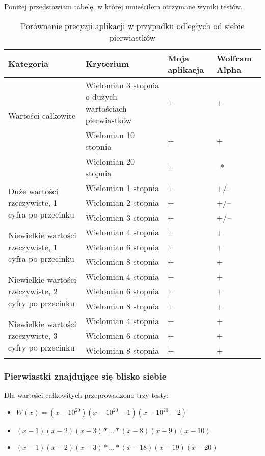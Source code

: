 Poniżej przedstawiam tabelę, w której umieściłem otrzymane wyniki testów.

\begin{table}
	\caption{Porównanie precyzji aplikacji w przypadku odległych od siebie pierwiastków}
	\begin{tabular}{ |p{5cm}|p{5cm}|p{1.5cm}|p{1.5cm}| } 
		\hline
		Kategoria & Kryterium & Moja aplikacja & Wolfram Alpha \\
		\hline
		\multirow{2}{*}{Wartości całkowite}
		& Wielomian 3 stopnia o dużych wartościach pierwiastków & + & + \\
		& Wielomian 10 stopnia & + & + \\
		& Wielomian 20 stopnia & + & --* \\
		\hline
		\multirow{3}{12em}{Duże wartości rzeczywiste, 1 cyfra po przecinku}
		& Wielomian 1 stopnia & + & +/-- \\
		& Wielomian 2 stopnia & + & +/-- \\
		& Wielomian 3 stopnia & + & +/-- \\
		\hline
		\multirow{3}{14em}{Niewielkie wartości rzeczywiste, 1 cyfra po przecinku}
		& Wielomian 4 stopnia & + & + \\
		& Wielomian 6 stopnia & + & + \\
		& Wielomian 8 stopnia & + & + \\
		\hline
		\multirow{3}{14em}{Niewielkie wartości rzeczywiste, 2 cyfry po przecinku}
		& Wielomian 4 stopnia & + & + \\
		& Wielomian 6 stopnia & + & + \\
		& Wielomian 8 stopnia & + & + \\
		\hline
		\multirow{3}{14em}{Niewielkie wartości rzeczywiste, 3 cyfry po przecinku}
		& Wielomian 4 stopnia & + & + \\
		& Wielomian 6 stopnia & + & + \\
		& Wielomian 8 stopnia & + & + \\
		\hline
	\end{tabular}
\end{table}

\subsubsection {Pierwiastki znajdujące się blisko siebie}

Dla wartości całkowitych przeprowadzono trzy testy:
\begin{itemize}
	\item $W(x)=(x-10^{20})(x-10^{20}-1)(x-10^{20}-2)$
	\item $(x-1)(x-2)(x-3)*...*(x-8)(x-9)(x-10)$
	\item $(x-1)(x-2)(x-3)*...*(x-18)(x-19)(x-20)$
\end{itemize}

